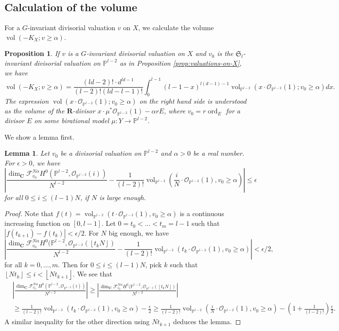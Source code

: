 \documentclass[letterpaper,11pt]{amsart}
\theoremstyle{plain}
\newtheorem{lemm}[theo]{Lemma}
\newtheorem{prop}[theo]{Proposition}
\theoremstyle{definition}
\theoremstyle{remark}
\newcommand{\eps}{\epsilon}
\newcommand{\PP}{\mathbb{P}}
\newcommand{\RR}{\mathbf{R}}
\newcommand{\CC}{\mathbf{C}}
\newcommand{\cF}{\mathcal{F}}
\newcommand{\cO}{\mathcal{O}}
\newcommand{\sta}{^{*}}
\newcommand{\lround}[1]{\left\lfloor #1 \right\rfloor}
\DeclareMathOperator{\vol}{vol}
\DeclareMathOperator{\ord}{ord}
\begin{document}
    \subsection{Calculation of the volume}
    For a $G$-invariant divisorial valuation $v$ on $X$, we calculate the volume $\vol(-K_X ; v\geq \alpha)$.

    \begin{prop} \label{prop:volume-of-v}
        If $v$ is a $G$-invariant divisorial valuation on $X$ and $v_{0}$ is the $\mathfrak{S}_{l}$-invariant divisorial valuation on $\PP^{l-2}$ as in Proposition \ref{prop:valuations-on-X}, we have
        $$ \vol(-K_X ; v \geq \alpha) = \frac{(ld-2)! \cdot d^{ld-1}}{(l-2)! (ld-l-1)!}\int_{0}^{l-1} (l-1-x)^{l(d-1)-1} \vol_{\PP^{l-2}}(x\cdot\cO_{\PP^{l-2}}(1); v_{0}\geq \alpha) dx.$$
        The expression $\vol(x \cdot \cO_{\PP^{l-2}}(1); v_{0}\geq \alpha)$ on the right hand side is understood as the volume of the $\RR$-divisor $x\cdot \mu\sta \cO_{\PP^{l-2}}(1) - \alpha r E$, where $v_{0} = r \ord_{E}$ for a divisor $E$ on some birational model $\mu \colon Y \to \PP^{l-2}$.
    \end{prop}

    We show a lemma first.
    \begin{lemm} \label{lemm:bound-for-volume}
        Let $v_0$ be a divisorial valuation on $\PP^{l-2}$ and $\alpha > 0$ be a real number. For $\eps > 0$, we have
        $$ \left| \frac{\dim_\CC \cF_{v_{0}}^{N\alpha} H^{0}(\PP^{l-2}, \cO_{\PP^{l-2}}(i)) }{N^{l-2}} - \frac{1}{(l-2)!} \vol_{\PP^{l-2}}\left( \frac{i}{N}\cdot \cO_{\PP^{l-2}}(1), v_{0} \geq \alpha \right) \right|\leq \eps$$
        for all $0 \leq i \leq (l-1)N$, if $N$ is large enough.
    \end{lemm}
    \begin{proof}
        Note that $f(t) =  \vol_{\PP^{l-2}}(t \cdot \cO_{\PP^{l-2}}(1), v_0 \geq \alpha)$ is a continuous increasing function on $[0, l-1]$. Let $0 = t_0 < \ldots < t_{m} = l-1$ such that $|f(t_{k+1}) - f(t_{k})| < \eps / 2$. For $N$ big enough, we have
        $$ \left| \frac{\dim_{\CC} \cF_{v_{0}}^{N\alpha} H^{0}(\PP^{l-2}, \cO_{\PP^{l-2}}(\lround{t_{k}N}) }{N^{l-2}} - \frac{1}{(l-2)!} \vol_{\PP^{l-2}}(t_{k}\cdot \cO_{\PP^{l-2}}(1), v_{0}\geq \alpha) \right| <\eps/2, $$
        for all $k = 0, \ldots, m$. Then for $0 \leq i \leq (l-1)N$, pick $k$ such that $\lround{Nt_{k}} \leq i < \lround{Nt_{k+1}}$. We see that
        \begin{align*}
            & \left| \frac{\dim_\CC \cF_{v_{0}}^{N\alpha} H^{0}(\PP^{l-2}, \cO_{\PP^{l-2}}(i)) }{N^{l-2}} \right| \geq \left| \frac{\dim_{\CC} \cF_{v_{0}}^{N\alpha} H^{0}(\PP^{l-2}, \cO_{\PP^{l-2}}(\lround{t_{k}N}) }{N^{l-2}} \right| \\
            & \geq \frac{1}{(l-2)!} \vol_{\PP^{l-2}}(t_{k}\cdot \cO_{\PP^{l-2}}(1), v_{0}\geq \alpha) - \frac{\eps}{2} \geq \frac{1}{(l-2)!}\vol_{\PP^{l-2}}\left(\frac{i}{N}\cdot \cO_{\PP^{l-2}}(1), v_{0}\geq \alpha\right) - \left(1 + \frac{1}{(l-2)!} \right)\frac{\eps}{2}.
        \end{align*}
        A similar inequality for the other direction using $Nt_{k+1}$ deduces the lemma.
    \end{proof}
\end{document}
